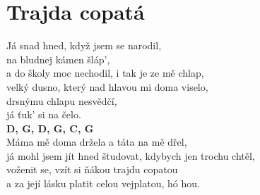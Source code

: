 \section{Trajda copatá}
\onehalfspacing

Já snad hned, když jsem se narodil, \\
na bludnej kámen šláp',\\
a do školy moc nechodil, i tak je ze mě chlap,\\
velký dusno, který nad hlavou mi doma viselo,\\
drsnýmu chlapu nesvědčí, \\
já ťuk' si na čelo. \\
\textbf{D, G, D, G, C, G}\\

Máma mě doma držela a táta na mě dřel,\\
já mohl jsem jít hned študovat, kdybych jen trochu chtěl,\\
voženit se, vzít si ňákou trajdu copatou\\
a za její lásku platit celou vejplatou, hó hou.\\

